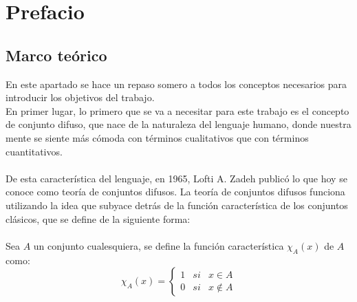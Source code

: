 \chapter{Prefacio}

\section{Marco teórico}
En este apartado se hace un repaso somero a todos los conceptos necesarios para introducir los objetivos del trabajo. \\
En primer lugar, lo primero que se va a necesitar para este trabajo es el concepto de conjunto difuso, que nace de la  naturaleza del lenguaje humano, donde nuestra mente se siente más cómoda con términos cualitativos que con términos cuantitativos.\\ \\
De esta característica del lenguaje, en 1965, Lofti A. Zadeh publicó lo que hoy se conoce como teoría de conjuntos difusos. La teoría de conjuntos difusos funciona utilizando la idea que subyace detrás de la función característica de los conjuntos clásicos, que se define de la siguiente forma: \\ \\
Sea $A$ un conjunto cualesquiera, se define la función característica $\chi_A(x)$ de $A$ como:
\[
	\chi_A(x) = \left\{
		\begin{array}{ccc}
			1 & si & x \in A \\
			0 & si & x \notin A
		\end{array}
	\right.
\]

